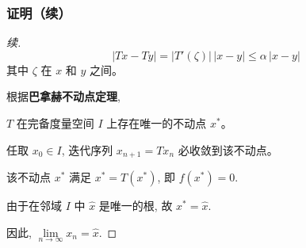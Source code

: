 \documentclass[hyperref={pdfpagelabels=false}, xelatex, aspectratio=169, 10pt]{beamer}
\begin{document}
\begin{frame}[fragile]
  \frametitle{证明（续）}
    \begin{proof}[续]

        \[ |Tx - Ty| = |T'(\zeta)|\,|x-y| \le \alpha\,|x-y| \]
        其中 $\zeta$ 在 $x$ 和 $y$ 之间。

    \medskip

    根据\textbf{巴拿赫不动点定理}, 
    
    $T$ 在完备度量空间 $I$ 上存在唯一的不动点 $x^*$。
    
    任取 $x_0 \in I$, 迭代序列 $x_{n+1}=Tx_n$ 必收敛到该不动点。

    该不动点 $x^*$ 满足 $x^* = T(x^*)$, 即 $f(x^*)=0$. 
    
    由于在邻域 $I$ 中 $\hat x$ 是唯一的根, 故 $x^* = \hat x$.

    因此, $\lim\limits_{n \to \infty} x_n = \hat x$.
  \end{proof}
\end{frame}
\end{document}
